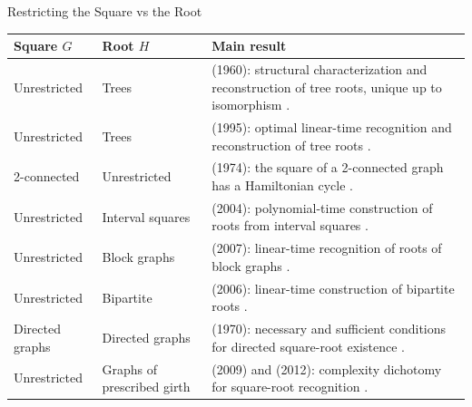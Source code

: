 \documentclass[10pt]{beamer}
\begin{document}
\begin{frame}{Restricting the Square vs the Root}
    \scriptsize
    \centering
    \begin{tabular}{p{2.0cm} p{2.0cm} p{6.0cm}}
    \hline
        \textbf{Square $G$} & \textbf{Root $H$} & \textbf{Main result} \\
        \hline
        Unrestricted
        & Trees
        & \citeauthor{ross_1960_square} (1960): structural characterization and reconstruction of tree roots, unique up to isomorphism
        \cite{ross_1960_square}. \\[4pt]

        Unrestricted
        & Trees
        & \citeauthor{lin_1995_square_roots} (1995): optimal linear-time recognition and reconstruction of tree roots
        \cite{lin_1995_square_roots}. \\[4pt]

        2-connected
        & Unrestricted
        & \citeauthor{fleischner_1974_square} (1974): the square of a 2-connected graph has a Hamiltonian cycle
        \cite{fleischner_1974_square}. \\[4pt]

        Unrestricted
        & Interval squares
        & \citeauthor{lau_corneil_2004_chordal_root} (2004): polynomial-time construction of roots from interval squares
        \cite{lau_corneil_2004_chordal_root}. \\[4pt]

        Unrestricted
        & Block graphs
        & \citeauthor{le_tuy_2007_block_square} (2007): linear-time recognition of roots of block graphs
        \cite{le_tuy_2007_block_square}. \\[4pt]

        Unrestricted
        & Bipartite
        & \citeauthor{lau_2006_bipartite_roots} (2006): linear-time construction of bipartite roots
        \cite{lau_2006_bipartite_roots}. \\[4pt]
        
        Directed graphs
        & Directed graphs
        & \citeauthor{geller_1970_root} (1970): necessary and sufficient conditions for directed square-root existence
        \cite{geller_1970_root}. \\[4pt]

        Unrestricted
        & Graphs of prescribed girth
        & \citeauthor{farzad_2009_roots} (2009) and \citeauthor{farzad_karimi_2012_root} (2012): complexity dichotomy for square-root recognition
        \cite{farzad_2009_roots,farzad_karimi_2012_root}. \\[4pt]


\end{tabular}
\end{frame}
\end{document}
